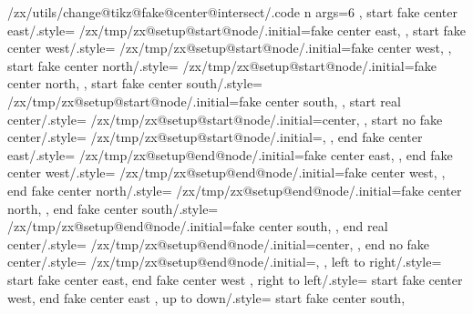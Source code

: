 {{    %
    /zx/utils/change@tikz@fake@center@intersect/.code n args={6}{%
    },
    start fake center east/.style={%
      /zx/tmp/zx@setup@start@node/.initial=fake center east,
    },
    start fake center west/.style={%
      /zx/tmp/zx@setup@start@node/.initial=fake center west,
    },
    start fake center north/.style={%
      /zx/tmp/zx@setup@start@node/.initial=fake center north,
    },
    start fake center south/.style={%
      /zx/tmp/zx@setup@start@node/.initial=fake center south,
    },
    start real center/.style={
      /zx/tmp/zx@setup@start@node/.initial=center,
    },
    start no fake center/.style={
      /zx/tmp/zx@setup@start@node/.initial=,
    },
    end fake center east/.style={%
      /zx/tmp/zx@setup@end@node/.initial=fake center east,
    },
    end fake center west/.style={%
      /zx/tmp/zx@setup@end@node/.initial=fake center west,
    },
    end fake center north/.style={%
      /zx/tmp/zx@setup@end@node/.initial=fake center north,
    },
    end fake center south/.style={%
      /zx/tmp/zx@setup@end@node/.initial=fake center south,
    },
    end real center/.style={
      /zx/tmp/zx@setup@end@node/.initial=center,
    },
    end no fake center/.style={
      /zx/tmp/zx@setup@end@node/.initial=,
    },
    left to right/.style={
      start fake center east,
      end fake center west
    },
    right to left/.style={
      start fake center west,
      end fake center east
    },
    up to down/.style={
      start fake center south,
}}}
